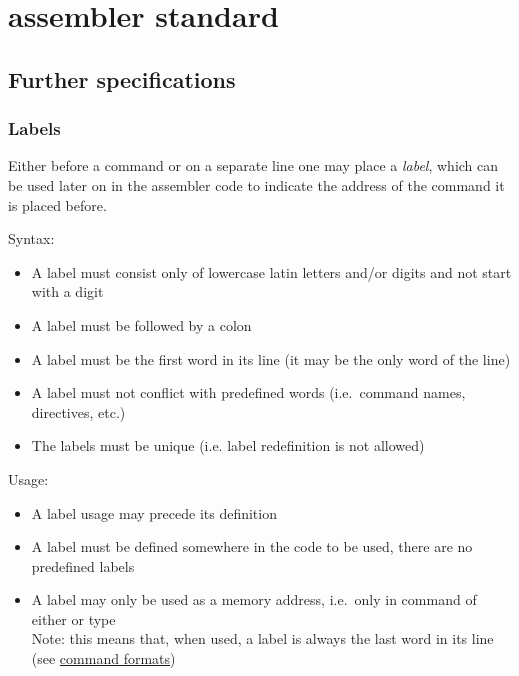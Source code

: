 \section{ assembler standard}






\newpage

\subsection{Further specifications}

\hypertarget{flags:details}{}

\subsubsection{Labels}

Either before a command or on a separate line one may place a \textit{label}, which can be used later on in the assembler code to indicate the address of the command it is placed before.

Syntax:

\begin{itemize}
    \item A label must consist only of lowercase latin letters and/or digits and not start with a digit
    \item A label must be followed by a colon
    \item A label must be the first word in its line (it may be the only word of the line)
    \item A label must not conflict with predefined words (i.e.\ command names, directives, etc.)
    \item The labels must be unique (i.e. label redefinition is not allowed)
\end{itemize}

Usage:

\begin{itemize}
    \item A label usage may precede its definition
    \item A label must be defined somewhere in the code to be used, there are no predefined labels
    \item A label may only be used as a memory address, i.e.\ only in command of either  or  type\\
    Note: this means that, when used, a label is always the last word in its line (see \hyperlink{command:formats}{command formats})
\end{itemize}


